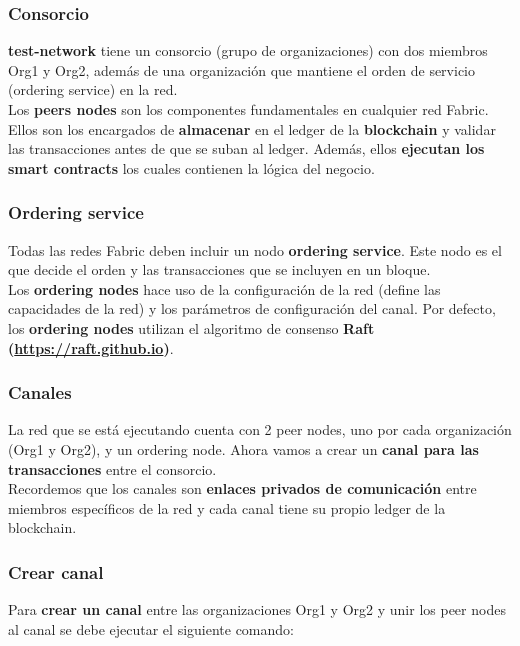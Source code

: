 \documentclass{beamer}
\begin{document}
	\begin{frame}
		\frametitle{Consorcio}
		\textbf{test-network} tiene  un consorcio (grupo de organizaciones)  con dos miembros Org1 y Org2, además de una organización que mantiene el orden de servicio (ordering service) en la red.\\
		\vspace{4mm}
		Los \textbf{peers nodes} son los componentes fundamentales en cualquier red Fabric. Ellos son los encargados de \textbf{almacenar} en el ledger de la \textbf{blockchain} y validar las transacciones antes de que se suban al ledger. Además, ellos \textbf{ejecutan los smart contracts} los cuales contienen la lógica del negocio.
	\end{frame}
	
	\begin{frame}
		\frametitle{Ordering service}
		Todas las redes Fabric deben incluir un nodo \textbf{ordering service}. Este nodo es el que decide el orden y las transacciones que se incluyen en un bloque.\\
		\vspace{4mm}
		Los \textbf{ordering nodes} hace uso de la configuración de la red (define las capacidades de la red) y los parámetros de configuración del canal. Por defecto, los \textbf{ordering nodes} utilizan el algoritmo de consenso \textbf{Raft (\url{https://raft.github.io})}.
	\end{frame}
	
	\begin{frame}
		\frametitle{Canales}
		La red que se está ejecutando cuenta con 2 peer nodes, uno por cada organización (Org1 y Org2), y un ordering node. Ahora vamos a crear un \textbf{canal para las transacciones} entre el consorcio.\\
		\vspace{4mm}
		Recordemos que los canales son \textbf{enlaces privados de comunicación} entre miembros específicos de la red y cada canal tiene su propio ledger de la blockchain.
	\end{frame}
	
	\begin{frame}
		\frametitle{Crear canal}
		Para \textbf{crear un canal} entre las organizaciones Org1 y Org2 y unir los peer nodes al canal se debe ejecutar el siguiente comando:
		\begin{center}
			\setlength{\fboxrule}{1mm}
			\setlength{\fboxsep}{3mm}
			\framebox[9cm][c]{
				\textbf{./network.sh createChannel}
			}
		\end{center}
	\end{frame}
\end{document}
